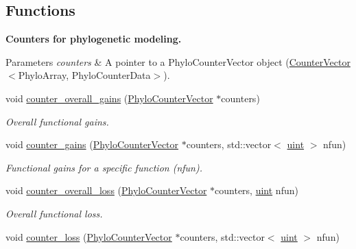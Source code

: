 \subsection*{Functions}
\begin{Indent}\textbf{ Counters for phylogenetic modeling.}\par
{\em 
\begin{DoxyParams}{Parameters}
{\em counters} & A pointer to a {\ttfamily Phylo\+Counter\+Vector} object ({\ttfamily \hyperlink{classbarry_1_1_counter_vector}{Counter\+Vector}}$<${\ttfamily Phylo\+Array}, {\ttfamily Phylo\+Counter\+Data}$>$). \\
\hline
\end{DoxyParams}
}\begin{DoxyCompactItemize}
\item 
void \hyperlink{namespacebarry_1_1counters_1_1phylo_a6f3a551165270e27f874d3df4d07cf8b}{counter\+\_\+overall\+\_\+gains} (\hyperlink{namespacebarry_1_1counters_1_1phylo_a2f117d1cd1dff67e1539cbc0aef5766a}{Phylo\+Counter\+Vector} $\ast$counters)
\begin{DoxyCompactList}\small\item\em Overall functional gains. \end{DoxyCompactList}\item 
void \hyperlink{namespacebarry_1_1counters_1_1phylo_ab040401fb8219f9023c9bfec80a4c78a}{counter\+\_\+gains} (\hyperlink{namespacebarry_1_1counters_1_1phylo_a2f117d1cd1dff67e1539cbc0aef5766a}{Phylo\+Counter\+Vector} $\ast$counters, std\+::vector$<$ \hyperlink{namespacebarry_a11dfc53ddb4672278319aa04f1e09a6c}{uint} $>$ nfun)
\begin{DoxyCompactList}\small\item\em Functional gains for a specific function ({\ttfamily nfun}). \end{DoxyCompactList}\item 
void \hyperlink{namespacebarry_1_1counters_1_1phylo_a45ae9af92d4821d218c99eaddaa9471e}{counter\+\_\+overall\+\_\+loss} (\hyperlink{namespacebarry_1_1counters_1_1phylo_a2f117d1cd1dff67e1539cbc0aef5766a}{Phylo\+Counter\+Vector} $\ast$counters, \hyperlink{namespacebarry_a11dfc53ddb4672278319aa04f1e09a6c}{uint} nfun)
\begin{DoxyCompactList}\small\item\em Overall functional loss. \end{DoxyCompactList}\item 
void \hyperlink{namespacebarry_1_1counters_1_1phylo_a3696a504003f84eadd48865dd8d51559}{counter\+\_\+loss} (\hyperlink{namespacebarry_1_1counters_1_1phylo_a2f117d1cd1dff67e1539cbc0aef5766a}{Phylo\+Counter\+Vector} $\ast$counters, std\+::vector$<$ \hyperlink{namespacebarry_a11dfc53ddb4672278319aa04f1e09a6c}{uint} $>$ nfun)

\end{DoxyCompactItemize}
\end{Indent}
